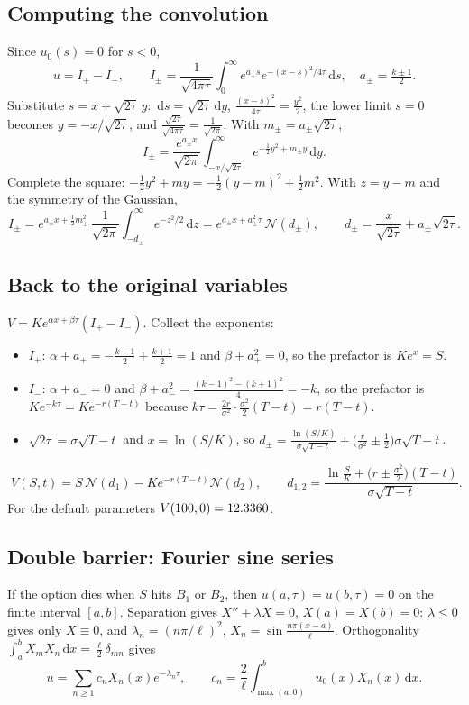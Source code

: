 \documentclass[11pt]{article}
\newcommand{\N}{\mathcal N}
\newcommand{\dd}{\,\mathrm d}
\theoremstyle{definition}
\begin{document}
\subsection{Computing the convolution}\label{sec:conv}
Since $u_0(s)=0$ for $s<0$,
\[
  u=I_+-I_-,\qquad I_\pm=\frac{1}{\sqrt{4\pi\tau}}\int_0^\infty e^{a_\pm s}e^{-(x-s)^2/4\tau}\dd s,\quad a_\pm=\tfrac{k\pm1}{2}.
\]
Substitute $s=x+\sqrt{2\tau}\,y$: $\dd s=\sqrt{2\tau}\dd y$, $\frac{(x-s)^2}{4\tau}=\frac{y^2}{2}$, the lower limit
$s=0$ becomes $y=-x/\sqrt{2\tau}$, and $\frac{\sqrt{2\tau}}{\sqrt{4\pi\tau}}=\frac{1}{\sqrt{2\pi}}$. With
$m_\pm=a_\pm\sqrt{2\tau}$,
\[
  I_\pm=\frac{e^{a_\pm x}}{\sqrt{2\pi}}\int_{-x/\sqrt{2\tau}}^\infty e^{-\frac12y^2+m_\pm y}\dd y .
\]
Complete the square: $-\frac12y^2+m y=-\frac12(y-m)^2+\frac12m^2$. With $z=y-m$ and the symmetry of the
Gaussian,
\[
  I_\pm=e^{a_\pm x+\frac12m_\pm^2}\,\frac{1}{\sqrt{2\pi}}\int_{-d_\pm}^\infty e^{-z^2/2}\dd z
  =e^{a_\pm x+a_\pm^2\tau}\,\N(d_\pm),\qquad d_\pm=\frac{x}{\sqrt{2\tau}}+a_\pm\sqrt{2\tau}.
\]

\subsection{Back to the original variables}
$V=Ke^{\alpha x+\beta\tau}(I_+-I_-)$. Collect the exponents:
\begin{itemize}[nosep]
  \item $I_+$: $\alpha+a_+=-\frac{k-1}2+\frac{k+1}2=1$ and $\beta+a_+^2=0$, so the prefactor is $Ke^x=S$.
  \item $I_-$: $\alpha+a_-=0$ and $\beta+a_-^2=\frac{(k-1)^2-(k+1)^2}{4}=-k$, so the prefactor is
    $Ke^{-k\tau}=Ke^{-r(T-t)}$ because $k\tau=\frac{2r}{\sigma^2}\cdot\frac{\sigma^2}{2}(T-t)=r(T-t)$.
  \item $\sqrt{2\tau}=\sigma\sqrt{T-t}$ and $x=\ln(S/K)$, so
    $d_\pm=\frac{\ln(S/K)}{\sigma\sqrt{T-t}}+\big(\frac{r}{\sigma^2}\pm\frac12\big)\sigma\sqrt{T-t}$.
\end{itemize}
\[
  \boxed{\;V(S,t)=S\,\N(d_1)-Ke^{-r(T-t)}\N(d_2),\qquad
  d_{1,2}=\frac{\ln\frac SK+\big(r\pm\frac{\sigma^2}{2}\big)(T-t)}{\sigma\sqrt{T-t}}.\;}
\]
For the default parameters $V(100,0)=\num{12.3360}$.

\subsection{Double barrier: Fourier sine series}
If the option dies when $S$ hits $B_1$ or $B_2$, then $u(a,\tau)=u(b,\tau)=0$ on the finite interval $[a,b]$.
Separation gives $X''+\lambda X=0$, $X(a)=X(b)=0$: $\lambda\le0$ gives only $X\equiv0$, and
$\lambda_n=(n\pi/\ell)^2$, $X_n=\sin\frac{n\pi(x-a)}{\ell}$. Orthogonality
$\int_a^bX_mX_n\dd x=\frac\ell2\delta_{mn}$ gives
\[
  u=\sum_{n\ge1}c_n X_n(x)e^{-\lambda_n\tau},\qquad c_n=\frac2\ell\int_{\max(a,0)}^bu_0(x)X_n(x)\dd x .
\]
\end{document}

